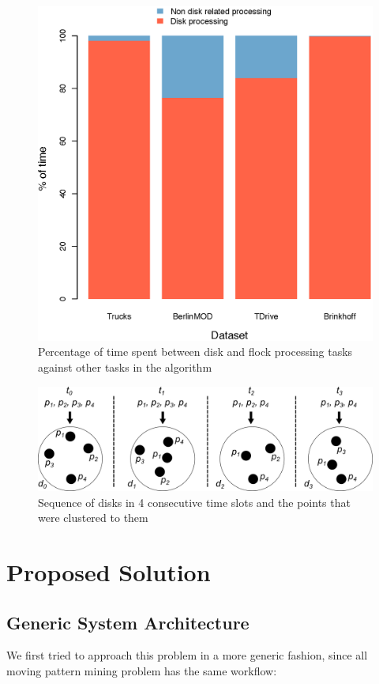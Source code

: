 \begin{figure}[h!]
    \centering
    \includegraphics[width=0.7\linewidth]{images/timeConsumption.eps}
    \caption{Percentage of time spent between disk and flock processing tasks against other tasks in the algorithm}
    \label{fig:time_consumption}
\end{figure}

\begin{figure}[h!]
    \centering
    \includegraphics[width=\linewidth]{images/disks_2.png}
    \caption{Sequence of disks in 4 consecutive time slots and the points that were clustered to them}
    \label{fig:disks}
\end{figure}

\section{Proposed Solution}
\subsection{Generic System Architecture}
We first tried to approach this problem in a more generic fashion, since all moving pattern mining problem has the same
workflow:

